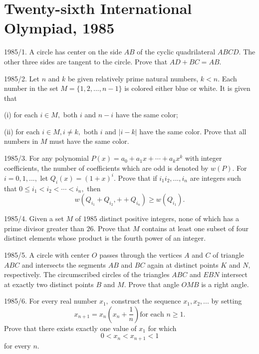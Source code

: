 \documentclass[12pt,thmsa]{article}
\begin{document}
\section{Twenty-sixth International Olympiad, 1985}

1985/1. A circle has center on the side $AB$ of the cyclic quadrilateral $%
ABCD.$ The other three sides are tangent to the circle. Prove that $%
AD+BC=AB. $

1985/2. Let $n$ and $k$ be given relatively prime natural numbers, $k<n.$
Each number in the set $M=\{1,2,...,n-1\}$ is colored either blue or white.
It is given that

(i) for each $i\in M,$ both $i$ and $n-i$ have the same color;

(ii) for each $i\in M,i\ne k,$ both $i$ and $\left| i-k\right| $ have the
same color. Prove that all numbers in $M$ must have the same color.

1985/3. For any polynomial $P(x)=a_{0}+a_{1}x+\cdots +a_{k}x^{k}$ with
integer coefficients, the number of coefficients which are odd is denoted by 
$w(P).$ For $i=0,1,...,$ let $Q_{i}(x)=(1+x)^{i}.$ Prove that if $%
i_{1}i_{2},...,i_{n}$ are integers such that $0\le i_{1}<i_{2}<\cdots
<i_{n}, $ then 
\[
w(Q_{i_{1}}+Q_{i_{2}},++Q_{i_{n}})\ge w(Q_{i_{1}}). 
\]

1985/4. Given a set $M$ of $1985$ distinct positive integers, none of which
has a prime divisor greater than $26$. Prove that $M$ contains at least one
subset of four distinct elements whose product is the fourth power of an
integer.

1985/5. A circle with center $O$ passes through the vertices $A$ and $C$ of
triangle $ABC$ and intersects the segments $AB$ and $BC$ again at distinct
points $K$ and $N,$ respectively. The circumscribed circles of the triangles 
$ABC$ and $EBN$ intersect at exactly two distinct points $B$ and $M.$ Prove
that angle $OMB$ is a right angle.

1985/6. For every real number $x_{1},$ construct the sequence $%
x_{1},x_{2},...$ by setting 
\[
x_{n+1}=x_{n}\left( x_{n}+\frac{1}{n}\right) \text{for each }n\geq 1.
\]
Prove that there exists exactly one value of $x_{1}$ for which 
\[
0<x_{n}<x_{n+1}<1
\]
for every $n.$
\end{document}
